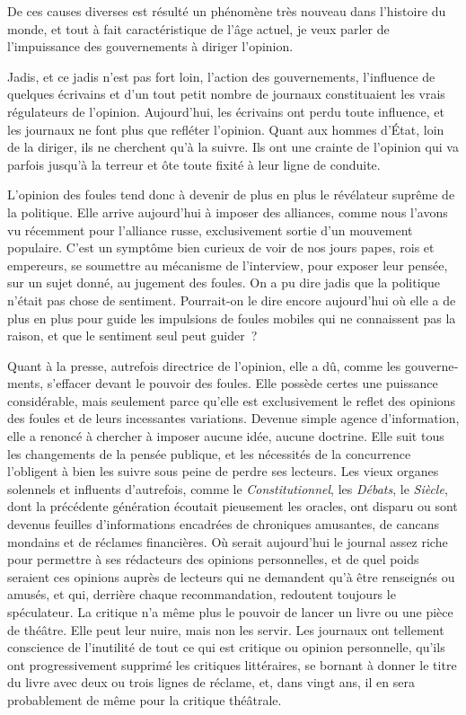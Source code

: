 \documentclass[french,twoside]{book} %
\begin{document}
De ces causes diverses est résulté un phénomène très nouveau dans l’histoire du monde, et tout à fait caractéristique de l’âge actuel, je veux parler de l’impuissance des gouvernements à diriger l’opinion.\par
Jadis, et ce jadis n’est pas fort loin, l’action des gouvernements, l’influence de quelques écrivains et d’un tout petit nombre de journaux constituaient les vrais régu­lateurs de l’opinion. Aujourd’hui, les écrivains ont perdu toute influence, et les journaux ne font plus que refléter l’opinion. Quant aux hommes d’État, loin de la diriger, ils ne cherchent qu’à la suivre. Ils ont une crainte de l’opinion qui va parfois jusqu’à la terreur et ôte toute fixité à leur ligne de conduite.\par
L’opinion des foules tend donc à devenir de plus en plus le révélateur suprême de la politique. Elle arrive aujourd’hui à imposer des alliances, comme nous l’avons vu récemment pour l’alliance russe, exclusivement sortie d’un mouvement populaire. C’est un symptôme bien curieux de voir de nos jours papes, rois et empereurs, se soumettre au mécanisme de l’interview, pour exposer leur pensée, sur un sujet donné, au jugement des foules. On a pu dire jadis que la politique n’était pas chose de sentiment. Pourrait-on le dire encore aujourd’hui où elle a de plus en plus pour guide les impulsions de foules mobiles qui ne connaissent pas la raison, et que le sentiment seul peut guider ?\par
Quant à la presse, autrefois directrice de l’opinion, elle a dû, comme les gouverne­ments, s’effacer devant le pouvoir des foules. Elle possède certes une puissance considérable, mais seulement parce qu’elle est exclusivement le reflet des opinions des foules et de leurs incessantes variations. Devenue simple agence d’information, elle a renoncé à chercher à imposer aucune idée, aucune doctrine. Elle suit tous les changements de la pensée publique, et les nécessités de la concurrence l’obligent à bien les suivre sous peine de perdre ses lecteurs. Les vieux organes solennels et influents d’autrefois, comme le \emph{Constitutionnel}, les \emph{Débats}, le\emph{ Siècle}, dont la précé­dente génération écoutait pieusement les oracles, ont disparu ou sont devenus feuilles d’informations encadrées de chroniques amusantes, de cancans mondains et de réclames financières. Où serait aujourd’hui le journal assez riche pour permettre à ses rédacteurs des opinions personnelles, et de quel poids seraient ces opinions auprès de lecteurs qui ne demandent qu’à être renseignés ou amusés, et qui, derrière chaque recommandation, redoutent toujours le spéculateur. La critique n’a même plus le pou­voir de lancer un livre ou une pièce de théâtre. Elle peut leur nuire, mais non les servir. Les journaux ont tellement conscience de l’inutilité de tout ce qui est critique ou opinion personnelle, qu’ils ont progressivement supprimé les critiques littéraires, se bornant à donner le titre du livre avec deux ou trois lignes de réclame, et, dans vingt ans, il en sera probablement de même pour la critique théâtrale.\par
\end{document}
